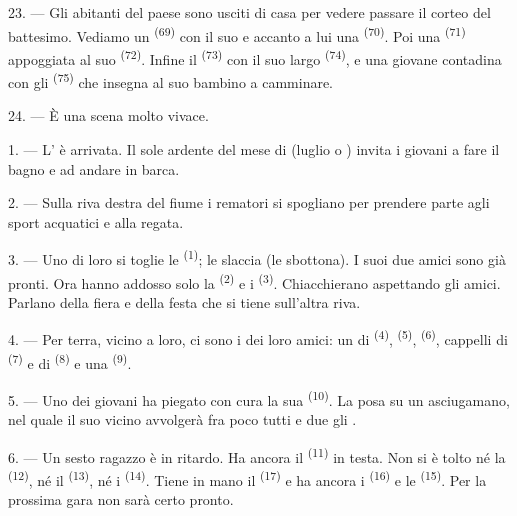 23. --- Gli abitanti del paese sono usciti di casa per vedere passare il corteo del
battesimo. Vediamo un  \textsuperscript{(69)} con il suo
 e accanto a lui una 
\textsuperscript{(70)}. Poi una  \textsuperscript{(71)} appoggiata al
suo  \textsuperscript{(72)}. Infine il 
\textsuperscript{(73)} con il suo largo 
\textsuperscript{(74)}, e una giovane contadina con gli 
\textsuperscript{(75)} che insegna al suo bambino a camminare.

24. --- È una scena molto vivace.
\VUsaut{4.0mm}

\VUsaut{3.0mm}

\VUsaut{2.4mm}

\VUsaut{3.0mm}

1. --- L' è arrivata. Il sole ardente del mese di 
(luglio o ) invita i giovani a fare il bagno e ad andare in barca.

2. --- Sulla riva destra del fiume i rematori si spogliano per prendere parte agli
sport acquatici e alla regata.

3. --- Uno di loro si toglie le  \textsuperscript{(1)}; le slaccia (le
sbottona). I suoi due amici sono già pronti. Ora hanno addosso solo la
 \textsuperscript{(2)} e i 
\textsuperscript{(3)}. Chiacchierano aspettando gli amici. Parlano della fiera e della
festa che si tiene sull'altra riva.

4. --- Per terra, vicino a loro, ci sono i  dei loro amici: un
 di  \textsuperscript{(4)}, 
\textsuperscript{(5)},  \textsuperscript{(6)}, cappelli di
 \textsuperscript{(7)} e di  \textsuperscript{(8)} e una
 \textsuperscript{(9)}.

5. --- Uno dei giovani ha piegato con cura la sua 
\textsuperscript{(10)}. La posa su un asciugamano, nel quale il suo vicino avvolgerà
fra poco tutti e due gli .

6. --- Un sesto ragazzo è in ritardo. Ha ancora il 
\textsuperscript{(11)} in testa. Non si è tolto né la 
\textsuperscript{(12)}, né il  \textsuperscript{(13)}, né i
 \textsuperscript{(14)}. Tiene in mano il 
\textsuperscript{(17)} e ha ancora i  \textsuperscript{(16)} e le
 \textsuperscript{(15)}. Per la prossima gara non sarà certo pronto.

